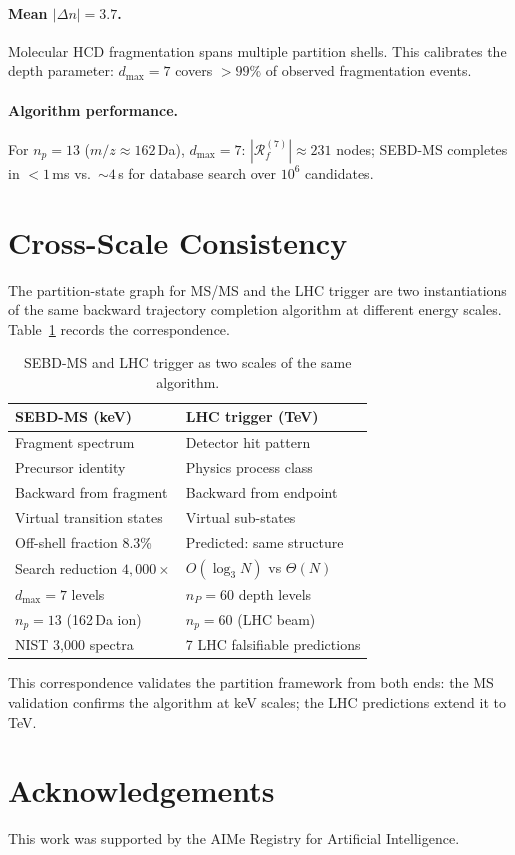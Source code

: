 \documentclass[twocolumn,10pt,a4paper]{article}
\theoremstyle{thmstyle}
\theoremstyle{definition}
\theoremstyle{remark}
\newcommand{\Reachf}{\mathcal{R}_f}
\begin{document}
\paragraph{Mean $|\Delta n| = 3.7$.}
Molecular HCD fragmentation spans multiple partition shells.
This calibrates the depth parameter: $d_\text{max} = 7$ covers $> 99\%$
of observed fragmentation events.

\paragraph{Algorithm performance.}
For $n_p = 13$ ($m/z \approx 162$\,Da), $d_\text{max} = 7$:
$|\Reachf^{(7)}| \approx 231$ nodes; SEBD-MS completes in $< 1$\,ms
vs.\ $\sim 4$\,s for database search over $10^6$ candidates.

\section{Cross-Scale Consistency}
\label{sec:crossscale}

The partition-state graph for MS/MS and the LHC trigger are two
instantiations of the same backward trajectory completion algorithm at
different energy scales.  Table~\ref{tab:crossscale} records the
correspondence.

\begin{table}[h]
\centering\small
\caption{SEBD-MS and LHC trigger as two scales of the same algorithm.}
\label{tab:crossscale}
\begin{tabular}{p{3.5cm}p{3.5cm}}
\toprule
\textbf{SEBD-MS (keV)} & \textbf{LHC trigger (TeV)} \\
\midrule
Fragment spectrum & Detector hit pattern \\
Precursor identity & Physics process class \\
Backward from fragment & Backward from endpoint \\
Virtual transition states & Virtual sub-states \\
Off-shell fraction 8.3\% & Predicted: same structure \\
Search reduction $4{,}000\times$ & $O(\log_3 N)$ vs $\Theta(N)$ \\
$d_\text{max} = 7$ levels & $n_P = 60$ depth levels \\
$n_p = 13$ (162\,Da ion) & $n_p = 60$ (LHC beam) \\
NIST 3{,}000 spectra & 7 LHC falsifiable predictions \\
\bottomrule
\end{tabular}
\end{table}

This correspondence validates the partition framework from both ends: the
MS validation confirms the algorithm at keV scales; the LHC predictions
extend it to TeV.

\section*{Acknowledgements}
This work was supported by the AIMe Registry for Artificial Intelligence.



\end{document}
